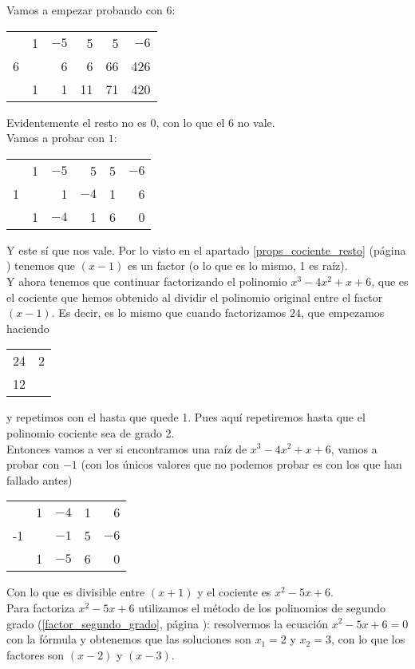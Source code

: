 \documentclass[a4paper,11pt,answers]{exam}
\begin{document}
Vamos a empezar probando con $6$:
\begin{center}
  \begin{tabular}{r|rrrrr}
    &1&$-5$&5&5&$-6$\\
    6&&6&6&66&426\\
    \hline
    &1&1&11&71&420
  \end{tabular}
\end{center}
Evidentemente el resto no es 0, con lo que el 6 no vale.\\
Vamos a probar con $1$:
\begin{center}
  \begin{tabular}{r|rrrrr}
    &1&$-5$&5&5&$-6$\\
    1&&1&$-4$&1&6\\
    \hline
    &1&$-4$&1&6&0
  \end{tabular}
\end{center}
Y este sí que nos vale. Por lo visto en el apartado \ref{props_cociente_resto} (página \pageref{props_cociente_resto}) tenemos que $(x-1)$ es un factor (o lo que es lo mismo, 1 es raíz).\\
Y ahora tenemos que continuar factorizando el polinomio $x^3 -4x^2 + x + 6$, que es el cociente que hemos obtenido al dividir el polinomio original entre el factor $(x-1)$. Es decir, es lo mismo que cuando factorizamos $24$, que empezamos haciendo
\begin{tabular}{r|r}
24&2\\12
\end{tabular} y repetimos con el hasta que quede 1. Pues aquí repetiremos hasta que el polinomio cociente sea de grado 2.\\

Entonces vamos a ver si encontramos una raíz de $x^3 -4x^2 + x + 6$, vamos a probar con $-1$ (con los únicos valores que no podemos probar es con los que han fallado antes)\\
\begin{center}
\begin{tabular}{r|rrrr}
  &1&$-4$&1&6\\
  -1&&$-1$&5&$-6$\\
  \hline
  &1&$-5$&6&0
\end{tabular}
\end{center}
Con lo que es divisible entre $(x+1)$ y el cociente es $x^2 -5x+6$.\\
Para factoriza $x^2 - 5x + 6$ utilizamos el método de los polinomios de segundo grado (\ref{factor_segundo_grado}, página \pageref{factor_segundo_grado}): resolvermos la ecuación $x^2 - 5x + 6 = 0$ con la fórmula y obtenemos que las soluciones son $x_1 = 2$ y $x_2 = 3$, con lo que los factores son $(x-2)$ y $(x-3)$.\\
\end{document}
